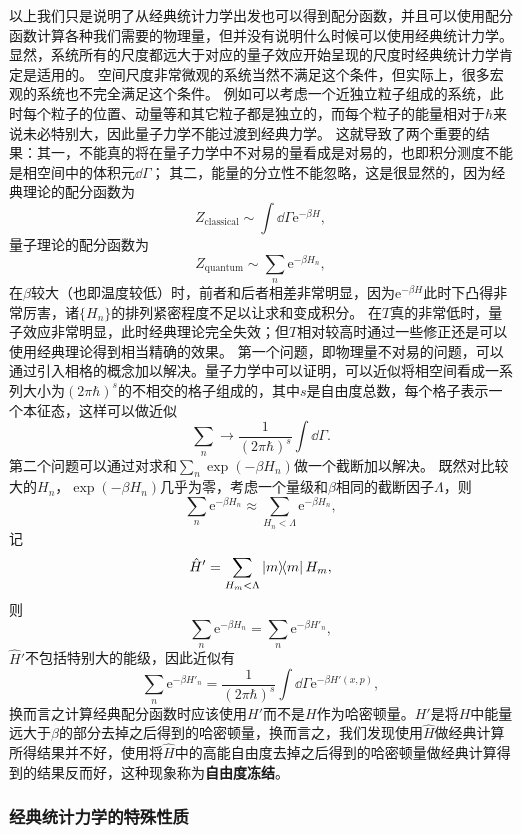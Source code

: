 \documentclass[hyperref, UTF8, a4paper]{ctexart}
\newcommand*{\ee}{\mathrm{e}}
\begin{document}
以上我们只是说明了从经典统计力学出发也可以得到配分函数，并且可以使用配分函数计算各种我们需要的物理量，但并没有说明什么时候可以使用经典统计力学。
显然，系统所有的尺度都远大于对应的量子效应开始呈现的尺度时经典统计力学肯定是适用的。
空间尺度非常微观的系统当然不满足这个条件，但实际上，很多宏观的系统也不完全满足这个条件。
例如可以考虑一个近独立粒子组成的系统，此时每个粒子的位置、动量等和其它粒子都是独立的，而每个粒子的能量相对于$\hbar$来说未必特别大，因此量子力学不能过渡到经典力学。
这就导致了两个重要的结果：其一，不能真的将在量子力学中不对易的量看成是对易的，也即积分测度不能是相空间中的体积元$\dd{\Gamma}$；
其二，能量的分立性不能忽略，这是很显然的，因为经典理论的配分函数为
\[
    Z_\text{classical} \sim \int \dd{\Gamma} \ee^{-\beta H},
\]
量子理论的配分函数为
\[
    Z_\text{quantum} \sim \sum_n \ee^{- \beta H_n},
\]
在$\beta$较大（也即温度较低）时，前者和后者相差非常明显，因为$\ee^{-\beta H}$此时下凸得非常厉害，诸$\{H_n\}$的排列紧密程度不足以让求和变成积分。
在$T$真的非常低时，量子效应非常明显，此时经典理论完全失效；但$T$相对较高时通过一些修正还是可以使用经典理论得到相当精确的效果。
第一个问题，即物理量不对易的问题，可以通过引入相格的概念加以解决。量子力学中可以证明，可以近似将相空间看成一系列大小为$(2\pi \hbar)^s$的不相交的格子组成的，其中$s$是自由度总数，每个格子表示一个本征态，这样可以做近似
\[
    \sum_n \longrightarrow \frac{1}{(2\pi \hbar)^s} \int \dd{\Gamma}.
\]
第二个问题可以通过对求和$\sum_n \exp (- \beta H_n)$做一个截断加以解决。
既然对比较大的$H_n$，$\exp(-\beta H_n)$几乎为零，考虑一个量级和$\beta$相同的截断因子$\Lambda$，则
\[
    \sum_n \ee^{-\beta H_n} \approx \sum_{H_n < \Lambda} \ee^{-\beta H_n},
\]
记
\[
    \hat{H}' = \sum_{H_m < \Lambda} \dyad{m} H_m,
\]
则
\[
    \sum_n \ee^{- \beta H_n} = \sum_n \ee^{- \beta H'_n},
\]
$\hat{H}'$不包括特别大的能级，因此近似有
\[
    \sum_n \ee^{-\beta H'_n} = \frac{1}{(2\pi \hbar)^s} \int \dd{\Gamma} \ee^{- \beta H'(x, p)},
\]
换而言之计算经典配分函数时应该使用$H'$而不是$H$作为哈密顿量。$H'$是将$H$中能量远大于$\beta$的部分去掉之后得到的哈密顿量，换而言之，我们发现使用$\hat{H}$做经典计算所得结果并不好，使用将$\hat{H}$中的高能自由度去掉之后得到的哈密顿量做经典计算得到的结果反而好，这种现象称为\textbf{自由度冻结}。

\subsubsection{经典统计力学的特殊性质}
\end{document}
